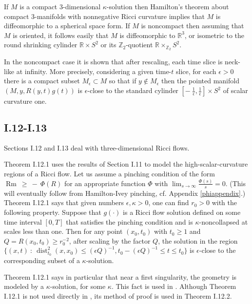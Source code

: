 \documentclass[12pt]{amsart}
\newcommand{\dist}{\operatorname{dist}}
\newcommand{\R}{{\mathbb R}}
\newcommand{\Rm}{\operatorname{Rm}}
\newcommand{\Z}{{\mathbb Z}}
\numberwithin{equation}{section}
\theoremstyle{plain}
\theoremstyle{definition}
\theoremstyle{remark}
\begin{document}
If $M$ is a compact $3$-dimensional $\kappa$-solution
then Hamilton's theorem about
compact $3$-manifolds with nonnegative Ricci curvature implies that $M$
is diffeomorphic to a spherical space form. If $M$ is noncompact then assuming
that $M$ is oriented, it follows easily that $M$ is
diffeomorphic to $\R^3$, or isometric to the round shrinking cylinder $\R \times S^2$
or its $\Z_2$-quotient $\R \times_{\Z_2} S^2$.

In the noncompact case it is shown that after rescaling, each time slice is neck-like at
infinity.  More precisely, considering a given time-$t$ slice, for each $\epsilon > 0$ 
there is a compact subset $M_\epsilon \subset M$ so that if $y \notin M_\epsilon$
then the pointed manifold $(M, y, R(y,t) g(t))$ is $\epsilon$-close
to the standard cylinder $\left[ - \: \frac{1}{\epsilon}, \frac{1}{\epsilon} \right] \times
S^2$ of scalar curvature one.

\subsection{I.12-I.13}

Sections I.12 and I.13 deal with three-dimensional Ricci flows.

Theorem I.12.1 uses the results of Section I.11 to model the
high-scalar-curvature regions of a Ricci flow. 
Let us assume a
pinching condition of the form $\Rm \: \ge \: - \: \Phi(R)$ for an
appropriate function $\Phi$ with $\lim_{s \rightarrow \infty}
\frac{\Phi(s)}{s} = 0$.
(This will eventually follow from Hamilton-Ivey pinching, 
 cf. Appendix \ref{phiappendix}.)
Theorem I.12.1 says that given
numbers $\epsilon, \kappa > 0$, one can find $r_0 > 0$ with the
following property. Suppose that $g(\cdot)$ is a Ricci flow solution
defined on some time interval $[0, T]$ that satisfies the
pinching condition and is $\kappa$-noncollapsed at scales less than
one.   Then for any point $(x_0, t_0)$ with $t_0 \ge 1$ and
$Q = R(x_0, t_0) \ge r_0^{-2}$, after scaling by the factor $Q$, the
solution in the region $\{(x,t) \: : \: \dist_{t_0}^2(x, x_0) \le (\epsilon Q)^{-1},
t_0 - (\epsilon Q)^{-1} \le t \le t_0\}$ is $\epsilon$-close to the 
corresponding subset of a $\kappa$-solution.

Theorem I.12.1 says in particular that near a first singularity, the geometry is modeled
by a $\kappa$-solution, for some $\kappa$. This fact is used in
\cite{Perelman2}. Although Theorem I.12.1 is not
used directly in \cite{Perelman}, its method of proof is used in Theorem I.12.2.
\end{document}
